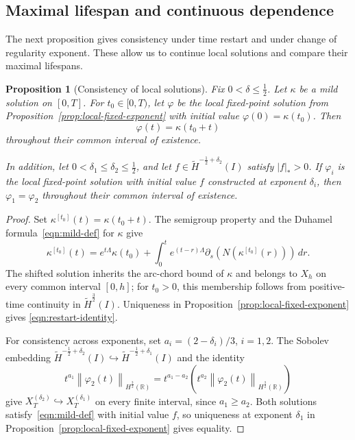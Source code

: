 \documentclass[11pt,reqno]{amsart}
\theoremstyle{plain}
\newtheorem{proposition}[theorem]{Proposition}
\theoremstyle{definition}
\numberwithin{equation}{section}
\newcommand{\paren}[1]{\left(#1\right)}
\newcommand{\p}{\partial}
\newcommand{\wt}[1]{\widetilde{#1}}
\newcommand{\abs}[1]{\left\lvert #1 \right\rvert}
\newcommand{\norm}[1]{\left\lVert #1 \right\rVert}
\newcommand{\vph}{\varphi}
\newcommand{\R}{\mathbb{R}}
\newcommand{\thi}[1]{\wt H^{#1}(I)}
\newcommand{\hr}[1]{H^{#1}(\R)}
\begin{document}
\subsection{Maximal lifespan and continuous dependence}
\label{subsec:lifespan}

The next proposition gives consistency under time restart and under
change of regularity exponent. These allow us to continue local
solutions and compare their maximal lifespans.

\begin{proposition}[Consistency of local solutions]
\label{lem:restart-uniqueness}
Fix $0<\delta\le\frac12$. Let $\kappa$ be a mild solution on $[0,T]$.
For $t_0\in[0,T)$, let $\vph$ be the local fixed-point solution from
Proposition~\ref{prop:local-fixed-exponent} with initial value
$\vph(0)=\kappa(t_0)$.
Then
\begin{equation}\label{eqn:restart-identity}
    \vph(t)=\kappa(t_0+t)
\end{equation}
throughout their common interval of existence.

In addition, let $0<\delta_1\le\delta_2\le\frac12$, and let
$f\in\thi{-\frac12+\delta_2}$ satisfy $\abs{f}_*>0$. If $\vph_i$ is the
local fixed-point solution with initial value $f$ constructed at exponent
$\delta_i$, then $\vph_1=\vph_2$ throughout their common interval of
existence.
\end{proposition}
\begin{proof}
Set $\kappa^{[t_0]}(t)=\kappa(t_0+t)$. The semigroup property and the Duhamel
formula~\eqref{eqn:mild-def} for $\kappa$ give
\begin{equation}\label{eqn:shifted-duhamel}
    \kappa^{[t_0]}(t)
    =e^{t\Lambda}\kappa(t_0)
    +\int_0^t e^{(t-r)\Lambda}
    \p_s\paren{N(\kappa^{[t_0]}(r))}\,dr.
\end{equation}
The shifted solution inherits the arc-chord bound of $\kappa$ and belongs to
$X_h$ on every common interval $[0,h]$; for $t_0>0$, this membership follows
from positive-time continuity in $\thi{\frac32}$. Uniqueness in
Proposition~\ref{prop:local-fixed-exponent} gives \eqref{eqn:restart-identity}.

For consistency across exponents, set $a_i=(2-\delta_i)/3$, $i=1,2$.
The Sobolev embedding
$\thi{-\frac12+\delta_2}\hookrightarrow\thi{-\frac12+\delta_1}$ and the identity
\begin{equation}
    t^{a_1}\norm{\vph_2(t)}_{\hr{\frac32}}
    =t^{a_1-a_2}
    \paren{t^{a_2}\norm{\vph_2(t)}_{\hr{\frac32}}}
\end{equation}
give $X_T^{(\delta_2)}\hookrightarrow X_T^{(\delta_1)}$ on every finite
interval, since $a_1\ge a_2$. Both solutions satisfy~\eqref{eqn:mild-def} with initial value $f$, so uniqueness at exponent $\delta_1$ in
Proposition~\ref{prop:local-fixed-exponent} gives equality.
\end{proof}
\end{document}
